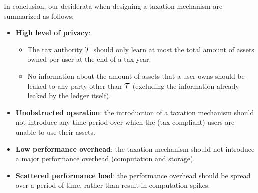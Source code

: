 In conclusion, our desiderata when designing a taxation mechanism are
summarized as follows:
\begin{itemize}
    \item \textbf{High level of privacy}:
        \begin{itemize}
            \item The tax authority $\mathcal{T}$ should only learn at most the
                total amount of assets owned per user at the end of a tax year.
            \item No information about the amount of assets that a user owns
                should be leaked to any party other than $\mathcal{T}$ (excluding
                the information already leaked by the ledger itself).
        \end{itemize}
    \item \textbf{Unobstructed operation}: the introduction of a taxation
        mechanism should not introduce any time period over which the (tax
        compliant) users are unable to use their assets.
    \item \textbf{Low performance overhead}: the taxation mechanism should not
        introduce a major performance overhead (\ie computation and storage).
    \item \textbf{Scattered performance load}: the performance overhead should
        be spread over a period of time, rather than result in computation
        spikes.
\end{itemize}

